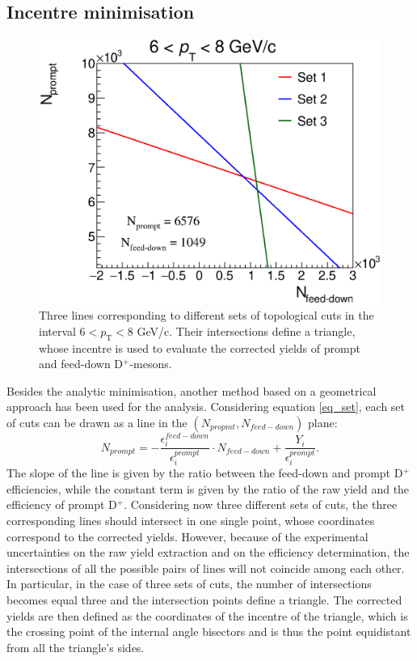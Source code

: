 \documentclass[b5paper,10pt,twoside,oldstyle,classica]{toptesi}
\newcommand{\pt}{p_\text{T}}
\begin{document}
\subsection{Incentre minimisation}
\begin{figure}[b]
\begin{center}
\includegraphics[scale = 0.35]{Lines_6-8.eps}
\caption{Three lines corresponding to different sets of topological cuts in the interval $6<\pt<8$ GeV/c. Their intersections define a triangle, whose incentre is used to evaluate the corrected yields of prompt and feed-down D$^+$-mesons.}
\label{lines}
\end{center}
\end{figure}
Besides the analytic minimisation, another method based on a geometrical approach has been used for the analysis. Considering equation \ref{eq_set}, each set of cuts can be drawn as a line in the $(N_{propmt},N_{feed-down})$ plane:
\begin{equation}
 N_{prompt} = -\frac{\epsilon^{feed-down}_i}{\epsilon^{prompt}_i} \cdot N_{feed-down} + \frac{Y_i}{\epsilon^{prompt}_i}.
\end{equation}
The slope of the line is given by the ratio between the feed-down and prompt D$^+$ efficiencies, while the constant term is given by the ratio of the raw yield and the efficiency of prompt D$^+$. Considering now three different sets of cuts, the three corresponding lines should intersect in one single point, whose coordinates correspond to the corrected yields. However, because of the experimental uncertainties on the raw yield extraction and on the efficiency determination, the intersections of all the possible pairs of lines will not coincide among each other. In particular, in the case of three sets of cuts, the number of intersections becomes equal three and the intersection points define a triangle. The corrected yields are then defined as the coordinates of the incentre of the triangle, which is the crossing point of the internal angle bisectors and is thus the point equidistant from all the triangle's sides. 
\end{document}
